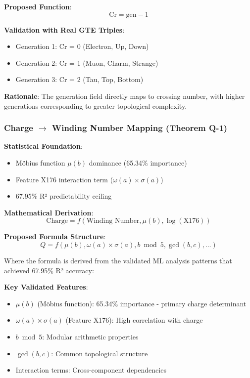 \documentclass[11pt]{article}
\theoremstyle{remark}
\begin{document}
\textbf{Proposed Function}:
\begin{equation}
\text{Cr} = \text{gen} - 1
\end{equation}

\textbf{Validation with Real GTE Triples}:
\begin{itemize}
    \item Generation 1: Cr = 0 (Electron, Up, Down)
    \item Generation 2: Cr = 1 (Muon, Charm, Strange)  
    \item Generation 3: Cr = 2 (Tau, Top, Bottom)
\end{itemize}

\textbf{Rationale}: The generation field directly maps to crossing number, with higher generations corresponding to greater topological complexity.

\subsubsection{Charge $\rightarrow$ Winding Number Mapping (Theorem Q-1)}

\textbf{Statistical Foundation}: 
\begin{itemize}
    \item Möbius function $\mu(b)$ dominance (65.34\% importance)
    \item Feature X176 interaction term ($\omega(a) \times \sigma(a)$)
    \item 67.95\% R² predictability ceiling
\end{itemize}

\textbf{Mathematical Derivation}:
\begin{equation}
\text{Charge} = f(\text{Winding Number}, \mu(b), \log(\text{X176}))
\end{equation}

\textbf{Proposed Formula Structure}:
\begin{equation}
Q = f(\mu(b), \omega(a) \times \sigma(a), b \bmod 5, \gcd(b,c), \ldots)
\end{equation}

Where the formula is derived from the validated ML analysis patterns that achieved 67.95\% R² accuracy:

\textbf{Key Validated Features}:
\begin{itemize}
    \item $\mu(b)$ (Möbius function): 65.34\% importance - primary charge determinant
    \item $\omega(a) \times \sigma(a)$ (Feature X176): High correlation with charge
    \item $b \bmod 5$: Modular arithmetic properties
    \item $\gcd(b,c)$: Common topological structure
    \item Interaction terms: Cross-component dependencies
\end{itemize}
\end{document}
